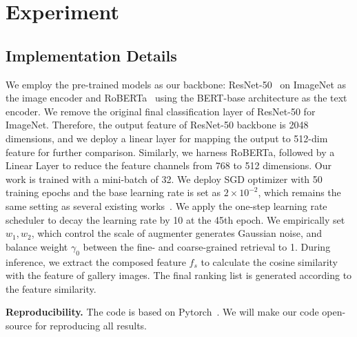 \documentclass[10pt,twocolumn,letterpaper]{article}
\begin{document}
\section{Experiment}
\subsection{Implementation Details}   
We employ the pre-trained models as our backbone: ResNet-50~\cite{He2015resnet} on ImageNet as the image encoder and RoBERTa~\cite{liu2019roberta} using the BERT-base architecture as the text encoder. 
We remove the original final classification layer of ResNet-50 for ImageNet. Therefore, the output feature of ResNet-50 backbone is 2048 dimensions, and we deploy a linear layer for mapping the output to 512-dim feature for further comparison. Similarly, we harness RoBERTa, followed by a Linear Layer to reduce the feature channels from 768 to 512 dimensions.
Our work is trained with a mini-batch of 32. We deploy SGD optimizer \cite{sgd} with 50 training epochs and the base learning rate is set as $2 \times 10^{-2}$, which remains the same setting as several existing works~\cite{2021CoSMo}. 
We apply the one-step learning rate scheduler to decay the learning rate by 10 at the 45th epoch.
We empirically set $w_1, w_2$, which control the scale of augmenter generates Gaussian noise, and balance weight $\gamma_0$ between the fine- and coarse-grained retrieval to 1. During inference, we extract the composed feature $f_s$ to calculate the cosine similarity with the feature of gallery images. The final ranking list is generated according to the feature similarity.

\noindent\textbf{Reproducibility.} The code is based on Pytorch~\cite{NEURIPS2019_9015}. We will make our code open-source for reproducing all results.
\end{document}
